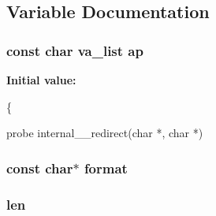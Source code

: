 \subsection{Variable Documentation}
\subsubsection[{\texorpdfstring{ap}{ap}}]{ const char va\+\_\+list ap}\hypertarget{group__APR__Strings__Snprintf_ga21ecbc810cd93b85a818c96ca2f92f1a}{}\label{group__APR__Strings__Snprintf_ga21ecbc810cd93b85a818c96ca2f92f1a}
{\bfseries Initial value\+:}
\begin{DoxyCode}
\{
  
  probe internal\_\_redirect(\textcolor{keywordtype}{char} *, \textcolor{keywordtype}{char} *)
\end{DoxyCode}
\subsubsection[{\texorpdfstring{format}{format}}]{ const char$\ast$ format}\hypertarget{group__APR__Strings__Snprintf_gafa8d2f476d8295cbd359245828f5d041}{}\label{group__APR__Strings__Snprintf_gafa8d2f476d8295cbd359245828f5d041}
\subsubsection[{\texorpdfstring{len}{len}}]{ len}\hypertarget{group__APR__Strings__Snprintf_ga7aaae9d6ec4ff865ec20a5ca802dc3af}{}\label{group__APR__Strings__Snprintf_ga7aaae9d6ec4ff865ec20a5ca802dc3af}
